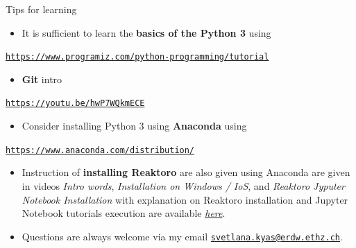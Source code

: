 \begin{frame}{Tips for learning}
\begin{itemize}
\item It is sufficient to learn the \alert{\textbf{basics of the Python 3}} using
\end{itemize}
\begin{center}
{\href{https://www.programiz.com/python-programming/tutorial}{\textcolor{indigo(dye)}{\tt https://www.programiz.com/python-programming/tutorial}}}{\large\par}
\par\end{center}
\begin{itemize}
\item \alert{\textbf{Git}} intro
\end{itemize}
\begin{center}
{\href{https://youtu.be/hwP7WQkmECE}{\textcolor{indigo(dye)}{\tt https://youtu.be/hwP7WQkmECE}}}{\large\par}
\par\end{center}
\begin{itemize}
\item Consider installing Python 3 using \alert{\textbf{Anaconda}} using
\end{itemize}
\begin{center}
{\href{https://www.anaconda.com/distribution/}{\textcolor{indigo(dye)}{\tt https://www.anaconda.com/distribution/}}}{\large\par}
\par\end{center}
\begin{itemize}
\item Instruction of \alert{\textbf{installing Reaktoro}} are also given using Anaconda are given in videos 
\emph{Intro words}, 
\emph{Installation on Windows / IoS}, and 
\emph{Reaktoro Jyputer Notebook Installation} with explanation on Reaktoro installation and Jupyter Notebook tutorials execution are available \href{https://polybox.ethz.ch/index.php/s/qStBnxUnry648U5}{\textcolor{indigo(dye)}{\it here}}. 
%
\item 
Questions are always welcome via my email \href{svetlana.kyas@erdw.ethz.ch}{\textcolor{indigo(dye)}{\tt svetlana.kyas@erdw.ethz.ch}}. 
\end{itemize}

\end{frame}
